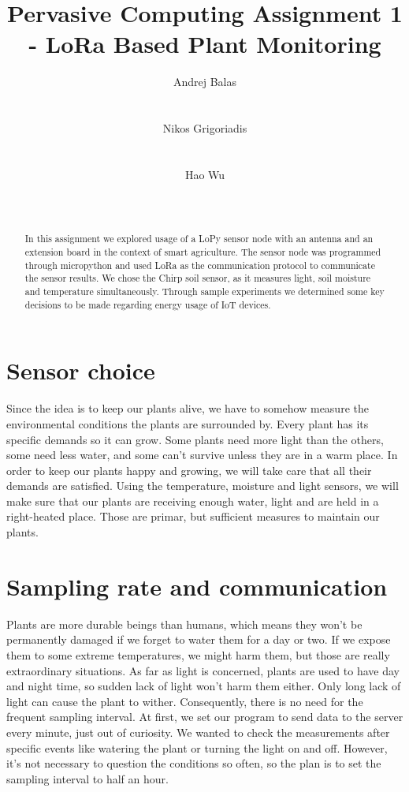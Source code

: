 \documentclass[10pt]{sensys-proc}
\author{
%
\alignauthor Andrej Balas \\
        \affaddr{Msc. Software Development Design}\\
        \affaddr{IT University Copenhagen}\\
       \email{bala@itu.dk}
\alignauthor Nikos Grigoriadis \\
        \affaddr{Msc. Software Development Design}\\
        \affaddr{IT University Copenhagen}\\
    \email{ngri@itu.dk}
\alignauthor Hao Wu \\
        \affaddr{Msc. Software Development Design}\\
        \affaddr{IT University Copenhagen}\\
    \email{hawu@itu.dk}
}
\title{Pervasive Computing Assignment 1 - LoRa Based Plant Monitoring}
\begin{document}
\maketitle

\begin{abstract}

In this assignment we explored usage of a LoPy sensor node with an antenna and an extension board in the context of smart agriculture. The sensor node was programmed through micropython and used LoRa as the communication protocol to communicate the sensor results. We chose the Chirp soil sensor, as it measures light, soil moisture and temperature simultaneously. Through sample experiments we determined some key decisions to be made regarding energy usage of IoT devices. 
\bigskip
\end{abstract}
\section{Sensor choice}
Since the idea is to keep our plants alive, we have to somehow measure the environmental conditions the plants are surrounded by. Every plant has its specific demands so it can grow. Some plants need more light than the others, some need less water, and some can't survive unless they are in a warm place. In order to keep our plants happy and growing, we will take care that all their demands are satisfied. Using the temperature, moisture and light sensors, we will make sure that our plants are receiving enough water, light and are held in a right-heated place. Those are primar, but sufficient measures to maintain our plants.
\bigskip
\section{Sampling rate and communication}
Plants are more durable beings than humans, which means they won't be permanently damaged if we forget to water them for a day or two. If we expose them to some extreme temperatures, we might harm them, but those are really extraordinary situations. As far as light is concerned, plants are used to have day and night time, so sudden lack of light won't harm them either. Only long lack of light can cause the plant to wither. Consequently, there is no need for the frequent sampling interval.
At first, we set our program to send data to the server every minute, just out of curiosity. We wanted to check the measurements after specific events like watering the plant or turning the light on and off. However, it's not necessary to question the conditions so often, so the plan is to set the sampling interval to half an hour.
\bigskip
\end{document}
